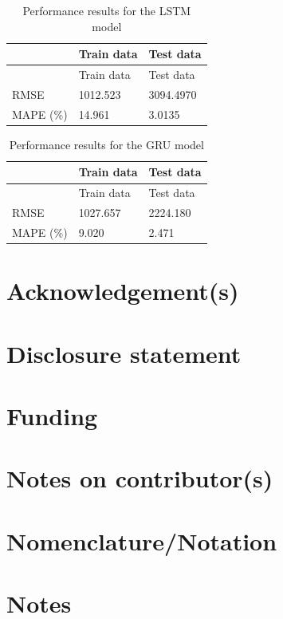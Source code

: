 \documentclass[]{interact}
\theoremstyle{plain}%
\theoremstyle{definition}
\theoremstyle{remark}
\begin{document}
\begin{longtable}[]{@{}lll@{}}
\caption{Performance results for the LSTM model}\tabularnewline
\toprule\noalign{}
& Train data & Test data \\
\midrule\noalign{}
\endfirsthead
\toprule\noalign{}
& Train data & Test data \\
\midrule\noalign{}
\endhead
\bottomrule\noalign{}
\endlastfoot
RMSE & 1012.523 & 3094.4970 \\
MAPE (\%) & 14.961 & 3.0135 \\
\end{longtable}

\begin{longtable}[]{@{}lll@{}}
\caption{Performance results for the GRU model}\tabularnewline
\toprule\noalign{}
& Train data & Test data \\
\midrule\noalign{}
\endfirsthead
\toprule\noalign{}
& Train data & Test data \\
\midrule\noalign{}
\endhead
\bottomrule\noalign{}
\endlastfoot
RMSE & 1027.657 & 2224.180 \\
MAPE (\%) & 9.020 & 2.471 \\
\end{longtable}

\section*{Acknowledgement(s)}\label{acknowledgements}

\section*{Disclosure statement}\label{disclosure-statement}

\section*{Funding}\label{funding}

\section*{Notes on contributor(s)}\label{notes-on-contributors}

\section*{Nomenclature/Notation}\label{nomenclaturenotation}

\section*{Notes}\label{notes}






\end{document}
